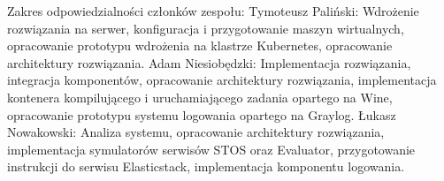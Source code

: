 \documentclass{szablonPG}
\begin{document}


\newpage
\thispagestyle{empty}
\mbox{}
\newpage



\tableofcontents








\printbibliography

\newpage
\thispagestyle{empty}
\noindent Zakres odpowiedzialności członków zespołu:
\newline Tymoteusz Paliński:
\newline Wdrożenie rozwiązania na serwer, konfiguracja i przygotowanie maszyn wirtualnych, opracowanie prototypu wdrożenia na klastrze Kubernetes, opracowanie architektury rozwiązania.
\newline Adam Niesiobędzki: 
\newline Implementacja rozwiązania, integracja komponentów, opracowanie architektury rozwiązania, implementacja kontenera kompilującego i uruchamiającego zadania opartego na Wine, opracowanie prototypu systemu logowania opartego na Graylog.
\newline Łukasz Nowakowski:
\newline Analiza systemu, opracowanie architektury rozwiązania, implementacja symulatorów serwisów STOS oraz Evaluator, przygotowanie instrukcji do serwisu Elasticstack, implementacja komponentu logowania.
\newpage
\end{document}
